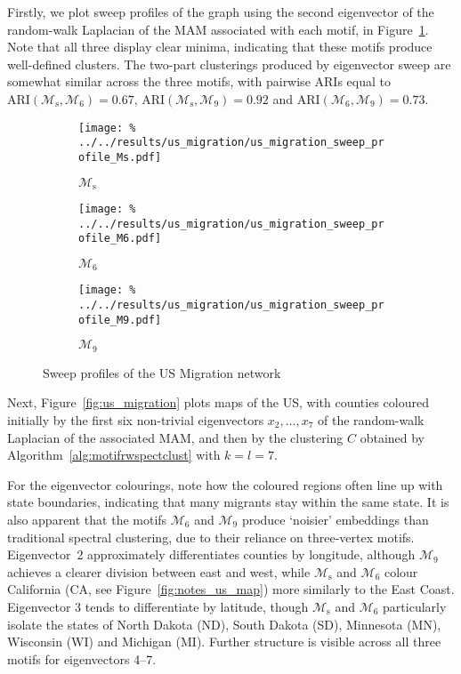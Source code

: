 \documentclass[12pt]{ociamthesis}
\theoremstyle{plain}
\theoremstyle{definition}
\theoremstyle{remark}
\newcommand\ca[1]{\mathcal{#1}}
\begin{document}
Firstly, we plot sweep profiles of the graph using the second eigenvector of
the random-walk Laplacian of the MAM associated with each motif, in
Figure~\ref{fig:migration_sweep}. Note that all three display clear minima,
indicating that these motifs produce well-defined clusters. The two-part
clusterings produced by eigenvector sweep are somewhat similar across the three
motifs, with pairwise ARIs equal to $\textrm{ARI}(\ca{M}_\mathrm{s}, \ca{M}_6)
= 0.67$, $\textrm{ARI}(\ca{M}_\mathrm{s}, \ca{M}_9) = 0.92$ and
$\textrm{ARI}(\ca{M}_6, \ca{M}_9) = 0.73$.

\begin{figure}[H]
  \begin{subfigure}{.325\textwidth}
    \centering
    \texttt{[image: \%
    ../../results/us\_migration/us\_migration\_sweep\_profile\_Ms.pdf]}
    \caption{$\ca{M}_\mathrm{s}$}
  \end{subfigure}
  \begin{subfigure}{.325\textwidth}
    \centering
    \texttt{[image: \%
    ../../results/us\_migration/us\_migration\_sweep\_profile\_M6.pdf]}
    \caption{$\ca{M}_6$}
  \end{subfigure}
  \begin{subfigure}{.325\textwidth}
    \centering
    \texttt{[image: \%
    ../../results/us\_migration/us\_migration\_sweep\_profile\_M9.pdf]}
    \caption{$\ca{M}_9$}
  \end{subfigure}
  \caption{Sweep profiles of the US Migration network}
  \label{fig:migration_sweep}
\end{figure}

Next, Figure~\ref{fig:us_migration} plots maps of the US, with counties
coloured initially by the first six non-trivial eigenvectors $x_2, \ldots, x_7$
of the random-walk Laplacian of the associated MAM, and then by the clustering
$C$ obtained by Algorithm~\ref{alg:motifrwspectclust} with $k=l=7$.

For the eigenvector colourings, note how the coloured regions often line up
with state boundaries, indicating that many migrants stay within the same
state.
It is also apparent that the motifs $\ca{M}_6$ and $\ca{M}_9$ produce `noisier'
embeddings than traditional spectral clustering, due to their reliance on
three-vertex motifs.
Eigenvector~2 approximately differentiates counties by longitude, although
$\ca{M}_9$ achieves a clearer division between east and west, while
$\ca{M}_\mathrm{s}$ and $\ca{M}_6$ colour California (CA, see
Figure~\ref{fig:notes_us_map}) more similarly to the East Coast.
Eigenvector 3 tends to differentiate by latitude, though $\ca{M}_\mathrm{s}$
and $\ca{M}_6$ particularly isolate the states of North Dakota (ND), South
Dakota (SD), Minnesota (MN), Wisconsin (WI) and Michigan (MI).
Further structure is visible across all three motifs for eigenvectors 4--7.
\end{document}

